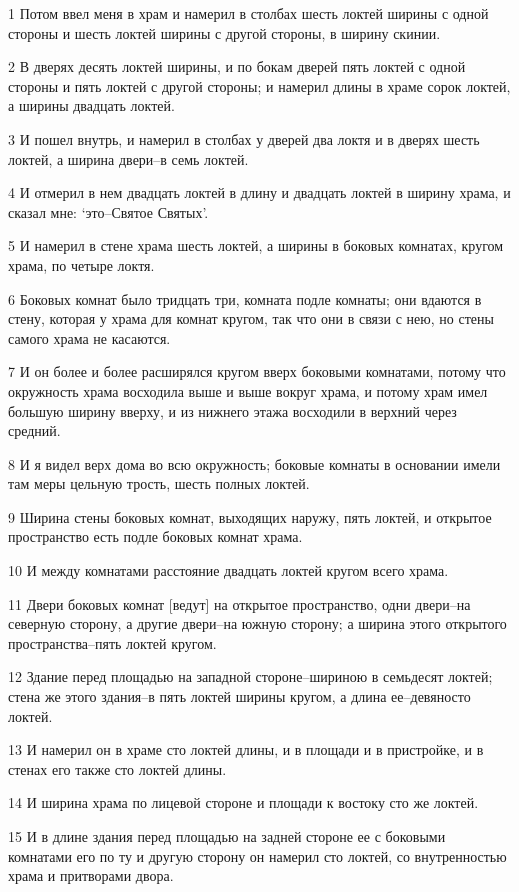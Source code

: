 \par 1 Потом ввел меня в храм и намерил в столбах шесть локтей ширины с одной стороны и шесть локтей ширины с другой стороны, в ширину скинии.
\par 2 В дверях десять локтей ширины, и по бокам дверей пять локтей с одной стороны и пять локтей с другой стороны; и намерил длины в храме сорок локтей, а ширины двадцать локтей.
\par 3 И пошел внутрь, и намерил в столбах у дверей два локтя и в дверях шесть локтей, а ширина двери--в семь локтей.
\par 4 И отмерил в нем двадцать локтей в длину и двадцать локтей в ширину храма, и сказал мне: `это--Святое Святых'.
\par 5 И намерил в стене храма шесть локтей, а ширины в боковых комнатах, кругом храма, по четыре локтя.
\par 6 Боковых комнат было тридцать три, комната подле комнаты; они вдаются в стену, которая у храма для комнат кругом, так что они в связи с нею, но стены самого храма не касаются.
\par 7 И он более и более расширялся кругом вверх боковыми комнатами, потому что окружность храма восходила выше и выше вокруг храма, и потому храм имел большую ширину вверху, и из нижнего этажа восходили в верхний через средний.
\par 8 И я видел верх дома во всю окружность; боковые комнаты в основании имели там меры цельную трость, шесть полных локтей.
\par 9 Ширина стены боковых комнат, выходящих наружу, пять локтей, и открытое пространство есть подле боковых комнат храма.
\par 10 И между комнатами расстояние двадцать локтей кругом всего храма.
\par 11 Двери боковых комнат [ведут] на открытое пространство, одни двери--на северную сторону, а другие двери--на южную сторону; а ширина этого открытого пространства--пять локтей кругом.
\par 12 Здание перед площадью на западной стороне--шириною в семьдесят локтей; стена же этого здания--в пять локтей ширины кругом, а длина ее--девяносто локтей.
\par 13 И намерил он в храме сто локтей длины, и в площади и в пристройке, и в стенах его также сто локтей длины.
\par 14 И ширина храма по лицевой стороне и площади к востоку сто же локтей.
\par 15 И в длине здания перед площадью на задней стороне ее с боковыми комнатами его по ту и другую сторону он намерил сто локтей, со внутренностью храма и притворами двора.
